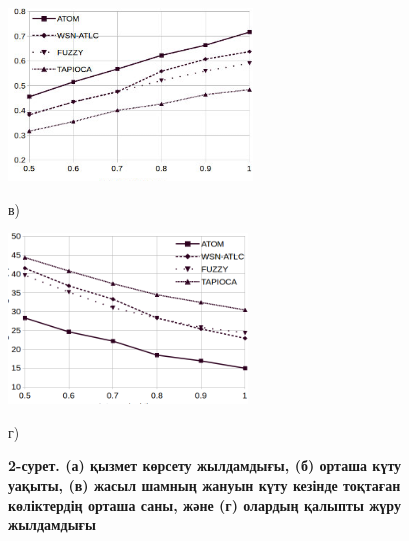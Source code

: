 \begin{figure}[H]
    \vspace{10pt} %

    \begin{minipage}{0.45\textwidth}
        \centering
        \includegraphics[width=\textwidth]{assets/159}
        \caption*{в)}
    \end{minipage}
    \hfill
    \begin{minipage}{0.45\textwidth}
        \centering
        \includegraphics[width=\textwidth]{assets/160}
        \caption*{г)}
    \end{minipage}

\caption*{\bfseries 2-сурет. (а) қызмет көрсету жылдамдығы, (б) орташа күту уақыты,
(в) жасыл шамның жануын күту кезінде тоқтаған көліктердің орташа саны,
және (г) олардың қалыпты жүру жылдамдығы}

\end{figure}




